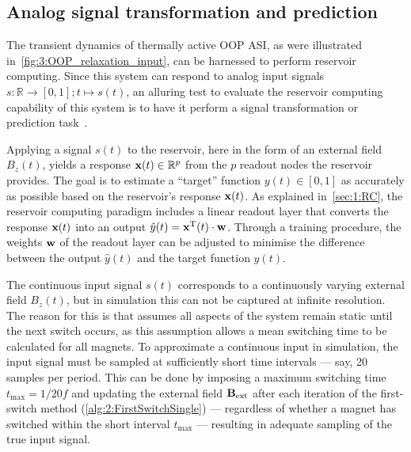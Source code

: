 \subsection{Analog signal transformation and prediction}
The transient dynamics of thermally active OOP ASI, as were illustrated in~\cref{fig:3:OOP_relaxation_input}, can be harnessed to perform reservoir computing.
Since this system can respond to analog input signals $s: \mathbb{R} \rightarrow [0, 1]; t \mapsto s(t)$, an alluring test to evaluate the reservoir computing capability of this system is to have it perform a signal transformation or prediction task~\cite{gartside2022reconfigurable,AdaptiveProgrammableRC,RC_NNN,TaskAdaptivePRC}. \par %
Applying a signal $s(t)$ to the reservoir, here in the form of an external field $B_z(t)$, yields a response $\boldsymbol{\mathbf{x}}(t) \in \mathbb{R}^p$ from the $p$ readout nodes the reservoir provides.
The goal is to estimate a ``target'' function $y(t) \in [0,1]$ as accurately as possible based on the reservoir's response $\boldsymbol{\mathbf{x}}(t)$.
As explained in~\cref{sec:1:RC}, the reservoir computing paradigm includes a linear readout layer that converts the response $\boldsymbol{\mathbf{x}}(t)$ into an output $\hat{y}(t) = \boldsymbol{\mathbf{x}}^\mathrm{T}(t) \cdot \boldsymbol{\mathbf{w}}$.
Through a training procedure, the weights $\boldsymbol{\mathbf{w}}$ of the readout layer can be adjusted to minimise the difference between the output $\hat{y}(t)$ and the target function $y(t)$. \par
The continuous input signal $s(t)$ corresponds to a continuously varying external field $B_z(t)$, but in simulation this can not be captured at infinite resolution.
The reason for this is that \hotspice assumes all aspects of the system remain static until the next switch occurs, as this assumption allows a mean switching time to be calculated for all magnets.
To approximate a continuous input in simulation, the input signal must be sampled at sufficiently short time intervals --- say, 20 samples per period.
This can be done by imposing a maximum switching time $t_\mathrm{max} = 1/20f$ and updating the external field $\boldsymbol{\mathbf{B}}_\mathrm{ext}$ after each iteration of the first-switch method (\cref{alg:2:FirstSwitchSingle}) --- regardless of whether a magnet has switched within the short interval $t_\mathrm{max}$ --- resulting in adequate sampling of the true input signal. \\\par

